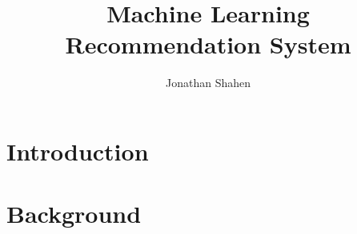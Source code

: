 \documentclass[10pt,a4paper]{article}
\title{Machine Learning Recommendation System}
\author{Jonathan Shahen}
\begin{document}
\maketitle

\section{Introduction}


\section{Background}


\nocite{*}


\end{document}
